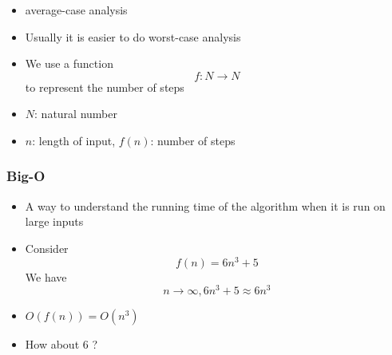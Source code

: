 \begin{frame}[allowframebreaks]
\begin{itemize}
\item average-case analysis
\item Usually it is easier to do worst-case analysis
\item We use a function
  \begin{equation*}
  f: N \rightarrow N
\end{equation*}
to represent the number of steps
\item [] $N$: natural number

\item [] $n$: length of input, $f(n)$: number of steps

\end{itemize}\end{frame} \begin{frame}[allowframebreaks] \frametitle{Big-O}
  \begin{itemize}
  \item
A way to understand the running time of the algorithm when
it is run on large inputs
\item Consider
  \begin{equation*}
  f(n)=6n^3 + 5
\end{equation*}
  We have
  \begin{equation*}
n \rightarrow \infty, 6n^3 + 5 \approx 6n^3
\end{equation*}
\item $O(f(n))=O(n^3)$

\item [] How about 6 ?


\end{itemize}
\end{frame}
